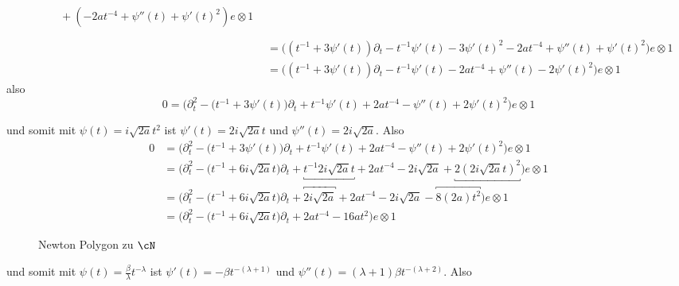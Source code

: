 \begin{try}
\begin{align*}
\begin{aligned}
    &\qquad + (- 2at^{-4} + \psi''(t) + \psi'(t)^2) e\otimes 1 \\
  \end{aligned} \\
  &= \Big((t^{-1} + 3\psi'(t))\partial_t
    - t^{-1} \psi'(t) - 3\psi'(t)^2 - 2at^{-4} + \psi''(t)
    + \psi'(t)^2\Big) e\otimes 1 \\
  &= \Big((t^{-1} + 3\psi'(t))\partial_t
    - t^{-1} \psi'(t) - 2at^{-4} + \psi''(t)
    - 2 \psi'(t)^2\Big) e\otimes 1
\end{align*}
also
\[
0 = \Big(\partial_t^2 - \big(t^{-1} + 3\psi'(t)\big)\partial_t
    + t^{-1} \psi'(t) + 2at^{-4} -\psi''(t)
    + 2 \psi'(t)^2\Big) e\otimes 1
\]
\begin{try}
und somit mit $\psi(t)=i\sqrt{2a}t^2$ ist $\psi'(t)=2i\sqrt{2a}t$ und
$\psi''(t)=2i\sqrt{2a}$. Also
\begin{align*}
0 &= \Big(\partial_t^2 - \big(t^{-1} + 3\psi'(t)\big)\partial_t
    + t^{-1} \psi'(t) + 2at^{-4} -\psi''(t)
    + 2 \psi'(t)^2\Big) e\otimes 1
\\&= \Big(\partial_t^2 - \big(t^{-1} + 6i\sqrt{2a}t\big)\partial_t
    + \underbracket{t^{-1} 2i\sqrt{2a}t} + 2at^{-4} - 2i\sqrt{2a}
    + \underbracket{2 (2i\sqrt{2a}t)^2}\Big) e\otimes 1
\\&= \Big(\partial_t^2 - \big(t^{-1} + 6i\sqrt{2a}t\big)\partial_t
    + \overbracket{2i\sqrt{2a}} + 2at^{-4} - 2i\sqrt{2a}
    - \overbracket{8 (2a) t^2}\Big) e\otimes 1
\\&= \Big(\partial_t^2 - \big(t^{-1} + 6i\sqrt{2a}t\big)\partial_t
    + 2at^{-4} - 16a t^2\Big) e\otimes 1
\end{align*}
\begin{figure}[H]
\caption{Newton Polygon zu $\cN$}
\begin{center}
\end{center}
\end{figure}
\end{try}
\begin{try}
und somit mit $\psi(t)=\frac{\beta}{\lambda}t^{-\lambda}$ ist 
$\psi'(t)=-\beta t^{-(\lambda+1)}$ und
$\psi''(t)=(\lambda+1)\beta t^{-(\lambda+2)}$. Also
\begin{align*}

\end{align*}
\end{try}
\end{try}
